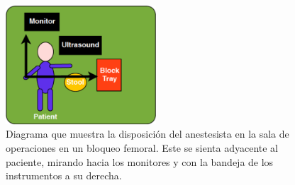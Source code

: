 \begin{figure}[th]
   \centering
    \includegraphics[width=0.5\textwidth]{IMG/roomplacement.png}
    \caption{Diagrama que muestra la disposición del anestesista en la sala de operaciones en un bloqueo femoral. Este se sienta adyacente al paciente, mirando hacia los monitores y con la bandeja de los instrumentos a su derecha.}
   \label{fig:roomplace}
\end{figure}
















